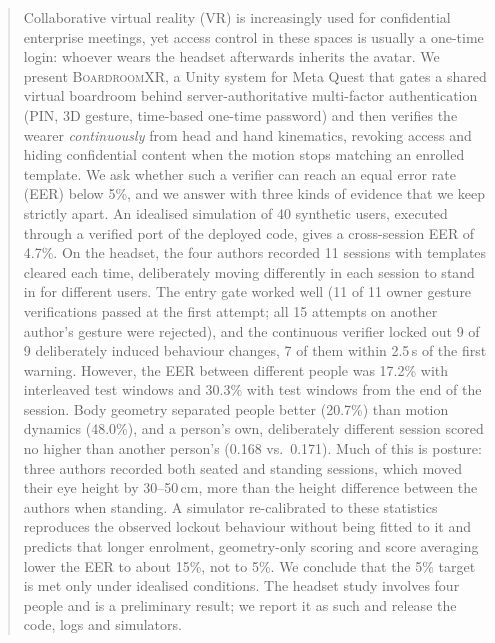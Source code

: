 \begin{abstract}
Collaborative virtual reality (VR) is increasingly used for confidential enterprise meetings, yet access control in these spaces is usually a one-time login: whoever wears the headset afterwards inherits the avatar. We present \textsc{BoardroomXR}, a Unity system for Meta Quest that gates a shared virtual boardroom behind server-authoritative multi-factor authentication (PIN, 3D gesture, time-based one-time password) and then verifies the wearer \emph{continuously} from head and hand kinematics, revoking access and hiding confidential content when the motion stops matching an enrolled template. We ask whether such a verifier can reach an equal error rate (EER) below 5\%, and we answer with three kinds of evidence that we keep strictly apart. An idealised simulation of 40 synthetic users, executed through a verified port of the deployed code, gives a cross-session EER of 4.7\%. On the headset, the four authors recorded 11 sessions with templates cleared each time, deliberately moving differently in each session to stand in for different users. The entry gate worked well (11 of 11 owner gesture verifications passed at the first attempt; all 15 attempts on another author's gesture were rejected), and the continuous verifier locked out 9 of 9 deliberately induced behaviour changes, 7 of them within 2.5\,s of the first warning. However, the EER between different people was 17.2\% with interleaved test windows and 30.3\% with test windows from the end of the session. Body geometry separated people better (20.7\%) than motion dynamics (48.0\%), and a person's own, deliberately different session scored no higher than another person's (0.168 vs.\ 0.171). Much of this is posture: three authors recorded both seated and standing sessions, which moved their eye height by 30--50\,cm, more than the height difference between the authors when standing. A simulator re-calibrated to these statistics reproduces the observed lockout behaviour without being fitted to it and predicts that longer enrolment, geometry-only scoring and score averaging lower the EER to about 15\%, not to 5\%. We conclude that the 5\% target is met only under idealised conditions. The headset study involves four people and is a preliminary result; we report it as such and release the code, logs and simulators.
\end{abstract}


